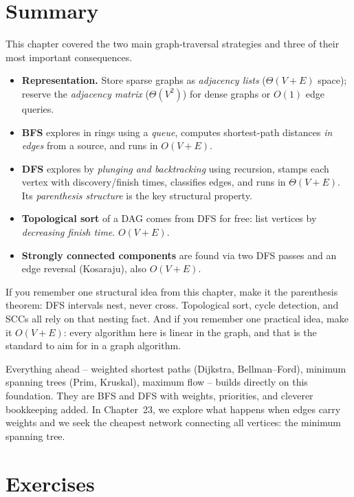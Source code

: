 \section{Summary}
\label{ch22:summary}

This chapter covered the two main graph-traversal strategies and three of their
most important consequences.

\begin{itemize}
\item \textbf{Representation.} Store sparse graphs as \emph{adjacency lists}
($\Theta(V+E)$ space); reserve the \emph{adjacency matrix} ($\Theta(V^2)$) for
dense graphs or $O(1)$ edge queries.
\item \textbf{BFS} explores in rings using a \emph{queue}, computes
shortest-path distances \emph{in edges} from a source, and runs in $O(V+E)$.
\item \textbf{DFS} explores by \emph{plunging and backtracking} using recursion,
stamps each vertex with discovery/finish times, classifies edges, and runs in
$\Theta(V+E)$. Its \emph{parenthesis structure} is the key structural property.
\item \textbf{Topological sort} of a DAG comes from DFS for free: list vertices
by \emph{decreasing finish time}. $O(V+E)$.
\item \textbf{Strongly connected components} are found via two DFS passes and an
edge reversal (Kosaraju), also $O(V+E)$.
\end{itemize}

\begin{focusbox}
If you remember one structural idea from this chapter, make it the parenthesis
theorem: DFS intervals nest, never cross. Topological sort, cycle detection, and
SCCs all rely on that nesting fact. And if you
remember one practical idea, make it $O(V+E)$: every algorithm here is linear in
the graph, and that is the standard to aim for in a graph algorithm.
\end{focusbox}

Everything ahead -- weighted shortest paths (Dijkstra, Bellman--Ford), minimum
spanning trees (Prim, Kruskal), maximum flow -- builds directly on this
foundation. They are BFS and DFS with weights, priorities, and cleverer
bookkeeping added. In Chapter~23, we explore what happens when edges carry weights and we seek the cheapest network connecting all vertices: the minimum spanning tree.

\section{Exercises}
\label{ch22:exercises}

